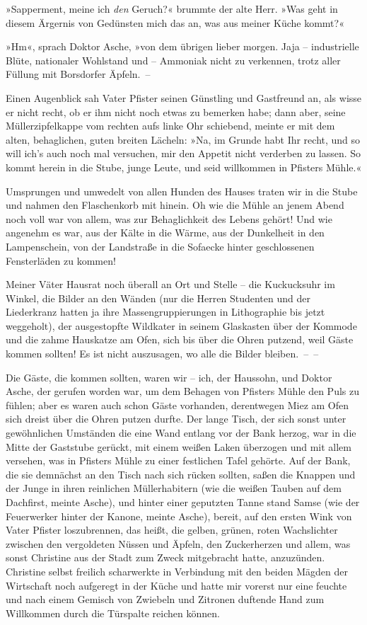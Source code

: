 »Sapperment, meine ich \emph{den} Geruch?« brummte der alte Herr.
»Was geht in diesem Ärgernis von Gedünsten mich das an, was aus
meiner Küche kommt?«

»Hm«, sprach Doktor Asche, »von dem übrigen lieber morgen. Jaja –
industrielle Blüte, nationaler Wohlstand und – Ammoniak nicht zu
verkennen, trotz aller Füllung mit Borsdorfer Äpfeln.~–

Einen Augenblick sah Vater Pfister seinen Günstling und Gastfreund
an, als wisse er nicht recht, ob er ihm nicht noch etwas zu
bemerken habe; dann aber, seine Müllerzipfelkappe vom rechten aufs
linke Ohr schiebend, meinte er mit dem alten, behaglichen, guten
breiten Lächeln: »Na, im Grunde habt Ihr recht, und so will ich's
auch noch mal versuchen, mir den Appetit nicht verderben zu lassen.
So kommt herein in die Stube, junge Leute, und seid willkommen in
Pfisters Mühle.«

Umsprungen und umwedelt von allen Hunden des Hauses traten wir in
die Stube und nahmen den Flaschenkorb mit hinein. Oh wie die Mühle
an jenem Abend noch voll war von allem, was zur Behaglichkeit des
Lebens gehört! Und wie angenehm es war, aus der Kälte in die Wärme,
aus der Dunkelheit in den Lampenschein, von der Landstraße in die
Sofaecke hinter geschlossenen Fensterläden zu kommen!

Meiner Väter Hausrat noch überall an Ort und Stelle – die
Kuckucksuhr im Winkel, die Bilder an den Wänden (nur die Herren
Studenten und der Liederkranz hatten ja ihre Massengruppierungen in
Lithographie bis jetzt weggeholt), der ausgestopfte Wildkater in
seinem Glaskasten über der Kommode und die zahme Hauskatze am Ofen,
sich bis über die Ohren putzend, weil Gäste kommen sollten! Es ist
nicht auszusagen, wo alle die Bilder bleiben.~–~–

Die Gäste, die kommen sollten, waren wir – ich, der Haussohn, und
Doktor Asche, der gerufen worden war, um dem Behagen von Pfisters
Mühle den Puls zu fühlen; aber es waren auch schon Gäste vorhanden,
derentwegen Miez am Ofen sich dreist über die Ohren putzen durfte.
Der lange Tisch, der sich sonst unter gewöhnlichen Umständen die
eine Wand entlang vor der Bank herzog, war in die Mitte der
Gaststube gerückt, mit einem weißen Laken überzogen und mit allem
versehen, was in Pfisters Mühle zu einer festlichen Tafel gehörte.
Auf der Bank, die sie demnächst an den Tisch nach sich rücken
sollten, saßen die Knappen und der Junge in ihren reinlichen
Müllerhabitern (wie die weißen Tauben auf dem Dachfirst, meinte
Asche), und hinter einer geputzten Tanne stand Samse (wie der
Feuerwerker hinter der Kanone, meinte Asche), bereit, auf den
ersten Wink von Vater Pfister loszubrennen, das heißt, die gelben,
grünen, roten Wachslichter zwischen den vergoldeten Nüssen und
Äpfeln, den Zuckerherzen und allem, was sonst Christine aus der
Stadt zum Zweck mitgebracht hatte, anzuzünden. Christine selbst
freilich scharwerkte in Verbindung mit den beiden Mägden der
Wirtschaft noch aufgeregt in der Küche und hatte mir vorerst nur
eine feuchte und nach einem Gemisch von Zwiebeln und Zitronen
duftende Hand zum Willkommen durch die Türspalte reichen können.

